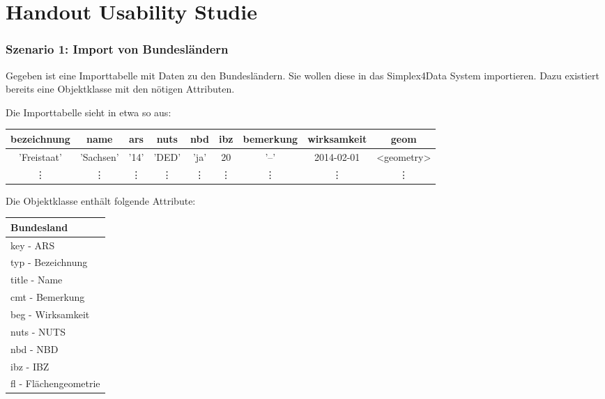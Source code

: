\ifdefined\STANDALONE\else
  \chapter{Handout Usability Studie}
  \label{app:handout}
\fi

\subsection*{Szenario 1: Import von Bundesländern}

\vspace{\baselineskip}\noindent
Gegeben ist eine Importtabelle mit Daten zu den Bundesländern. Sie wollen diese in das Simplex4Data System importieren. Dazu existiert bereits eine Objektklasse mit den nötigen Attributen.

\vspace{\baselineskip}\noindent
Die Importtabelle sieht in etwa so aus:

\begin{flushleft}
  \begin{tabular}{||c | c | c | c | c | c | c | c | c ||}
    \hline
    bezeichnung & name      & ars    & nuts   & nbd    & ibz    & bemerkung & wirksamkeit & geom       \\ [0.5ex]
    \hline\hline
    'Freistaat' & 'Sachsen' & '14'   & 'DED'  & 'ja'   & 20     & '--'      & 2014-02-01  & <geometry> \\
    \hline
    \vdots      & \vdots    & \vdots & \vdots & \vdots & \vdots & \vdots    & \vdots      & \vdots     \\
    \hline
  \end{tabular}
\end{flushleft}

\vspace{\baselineskip}\noindent
Die Objektklasse enthält folgende Attribute:
\begin{flushleft}
  \begin{tabular}{ || l || }
    \hline
    Bundesland            \\
    \hline
    key - ARS             \\
    typ - Bezeichnung     \\
    title - Name          \\
    cmt - Bemerkung       \\
    beg - Wirksamkeit     \\
    nuts - NUTS           \\
    nbd - NBD             \\
    ibz - IBZ             \\
    fl - Flächengeometrie \\
    \hline
  \end{tabular}
\end{flushleft}

